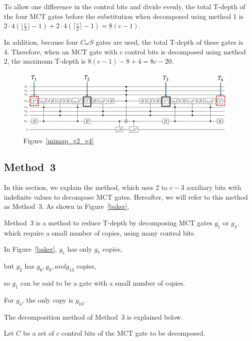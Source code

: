 To allow one difference in the control bits and divide evenly,
the total T-depth of the four MCT gates before the substitution when decomposed using method 1 is
$2 \cdot 4(\lfloor \frac{c}{2} \rfloor -1) +2\cdot 4(\lceil \frac{c}{2} \rceil -1)=8(c-1)$.

In addition, because four $C\omega S$ gates are used, the total T-depth of these gates is $4$. 
Therefore, when an MCT gate with $c$ control bits is decomposed using method 2, the maximum T-depth is $8(c-1)-8+4=8c-20$.
\begin{figure}[tbp]
\centering
\includegraphics[width=18cm]{img/mimap_g2_g4_transform.pdf}
\caption{Figure~\ref{mimap_g2_g4}}
\label{mimap_g2_g4_trans}
\end{figure}
\subsection{Method~3}
In this section, we explain the method\cite{baker2019decomposing}, which uses 2 to $c-3$ auxiliary bits with indefinite values to decompose MCT gates.
Hereafter, we will refer to this method as Method~3.
As shown in Figure~\ref{baker},

Method~3 is a method to reduce T-depth by decomposing MCT gates $g_{1}$ or $g_{4}$, which require a small number of copies, using many control bits.

In Figure~\ref{baker}, $g_{1}$ has only $g_{7}$ copies,

but $g_{2}$ has $g_{6}, g_{8}, and g_{13}$ copies,

so $g_{1}$ can be said to be a gate with a small number of copies.

For $g_{4}$, the only copy is $g_{10}$.

\par
The decomposition method of Method~3 is explained below.

Let $C$ be a set of $c$ control bits of the MCT gate to be decomposed.

